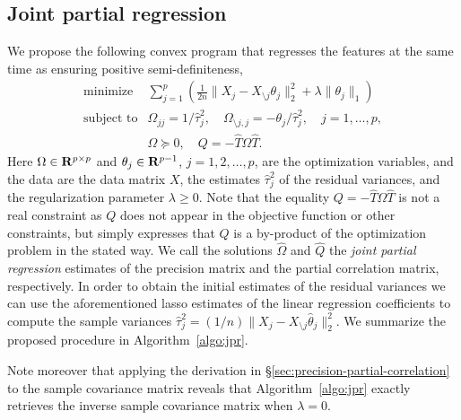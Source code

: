 \documentclass{article}
\begin{document}
\subsection{Joint partial regression}
We propose the following convex program that regresses the features at the same
time as ensuring positive semi-definiteness,
\begin{equation}\label{eq:cvx-prob}
    \begin{array}{ll}
        \text{minimize} & \displaystyle \sum_{j=1}^{p} \left( \frac{1}{2n} \|X_j - X_{\setminus j} \theta_j\|_2^2 + \lambda \|\theta_j\|_1 \right)\\
        \text{subject to} & \Omega_{jj} = 1 / \hat\tau_j^2, \quad \Omega_{\setminus j, j} = -\theta_j / \hat\tau_j^2, \quad j = 1, \dots, p, \\
        & \Omega \succeq 0, \quad Q = -\widehat{T} \Omega \widehat{T}.
    \end{array}
\end{equation}
Here $\Omega\in{\mathbf{R}}^{p\times p}$ and $\theta_j\in{\mathbf{R}}^{p-1}$, $j=1,2,\dots,p$, are
the optimization variables, and the data are the data matrix $X$, the estimates
$\hat\tau_j^2$ of the residual variances, and the regularization parameter
$\lambda \geq 0$. Note that the equality $Q = -\widehat{T}\Omega\widehat{T}$ is
not a real constraint as $Q$ does not appear in the objective function or other
constraints, but simply expresses that $Q$ is a by-product of the optimization
problem in the stated way. We call the solutions $\widehat{\Omega}$ and
$\widehat{Q}$ the \emph{joint partial regression} estimates of the precision
matrix and the partial correlation matrix, respectively. In order to obtain the
initial estimates of the residual variances we can use the aforementioned lasso
estimates of the linear regression coefficients to compute the sample variances
$\hat \tau_j^2 = (1/n) \|X_j - X_{\setminus j} \hat \theta_j\|_2^2$. We
summarize the proposed procedure in Algorithm~\ref{algo:jpr}.

Note moreover that applying the derivation in
\S\ref{sec:precision-partial-correlation} to the sample covariance matrix
reveals that Algorithm~\ref{algo:jpr} exactly retrieves the inverse sample
covariance matrix when $\lambda = 0$.
\end{document}
